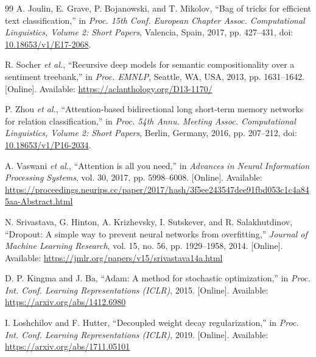 \begin{thebibliography}{99}
A. Joulin, E. Grave, P. Bojanowski, and T. Mikolov, ``Bag of tricks for efficient text classification,'' in \emph{Proc. 15th Conf. European Chapter Assoc. Computational Linguistics, Volume 2: Short Papers}, Valencia, Spain, 2017, pp. 427--431, doi: \href{https://doi.org/10.18653/v1/E17-2068}{10.18653/v1/E17-2068}.

R. Socher \emph{et al.}, ``Recursive deep models for semantic compositionality over a sentiment treebank,'' in \emph{Proc. EMNLP}, Seattle, WA, USA, 2013, pp. 1631--1642. [Online]. Available: \url{https://aclanthology.org/D13-1170/}

P. Zhou \emph{et al.}, ``Attention-based bidirectional long short-term memory networks for relation classification,'' in \emph{Proc. 54th Annu. Meeting Assoc. Computational Linguistics, Volume 2: Short Papers}, Berlin, Germany, 2016, pp. 207--212, doi: \href{https://doi.org/10.18653/v1/P16-2034}{10.18653/v1/P16-2034}.

A. Vaswani \emph{et al.}, ``Attention is all you need,'' in \emph{Advances in Neural Information Processing Systems}, vol. 30, 2017, pp. 5998--6008. [Online]. Available: \url{https://proceedings.neurips.cc/paper/2017/hash/3f5ee243547dee91fbd053c1c4a845aa-Abstract.html}

N. Srivastava, G. Hinton, A. Krizhevsky, I. Sutskever, and R. Salakhutdinov, ``Dropout: A simple way to prevent neural networks from overfitting,'' \emph{Journal of Machine Learning Research}, vol. 15, no. 56, pp. 1929--1958, 2014. [Online]. Available: \url{https://jmlr.org/papers/v15/srivastava14a.html}

D. P. Kingma and J. Ba, ``Adam: A method for stochastic optimization,'' in \emph{Proc. Int. Conf. Learning Representations (ICLR)}, 2015. [Online]. Available: \url{https://arxiv.org/abs/1412.6980}

I. Loshchilov and F. Hutter, ``Decoupled weight decay regularization,'' in \emph{Proc. Int. Conf. Learning Representations (ICLR)}, 2019. [Online]. Available: \url{https://arxiv.org/abs/1711.05101}
\end{thebibliography}
